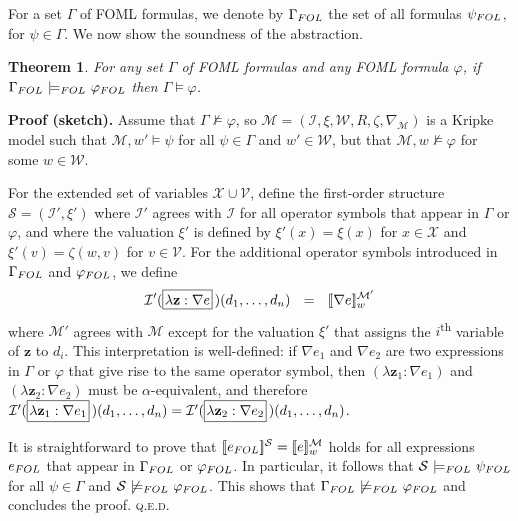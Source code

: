 \documentclass{easychair}
\renewcommand{\vec}[1]{\mathbf{#1}}
\renewcommand{\qed}{\hspace*{\fill}\textsc{q.e.d.}}
\renewcommand{\th}{\textsuperscript{th}\xspace}
\newcommand{\sem}[1]{\ensuremath{[\![ #1 ]\!]}}
\newcommand{\FOL}[1]{\ensuremath{#1_{\textit{\scriptsize FOL}}}}
\newcommand{\folmodels}{\mathop{\models_{\textit{\scriptsize FOL}}}}
\newcommand{\nfolmodels}{\mathop{\not\models_{\textit{\scriptsize FOL}}}}
\newcommand{\modal}{\nabla}
\newcommand{\II}{\mathcal{I}}
\newcommand{\MM}{\mathcal{M}}
\renewcommand{\SS}{\mathcal{S}}
\newcommand{\VV}{\mathcal{V}}
\newcommand{\WW}{\mathcal{W}}
\newcommand{\XX}{\mathcal{X}}
\newcommand{\B}[1]{\framebox{\rule{0pt}{.6em}\ensuremath{\!\tlachars #1\!}}\,}
\newcommand{\edmargin}[2]{\marginpar{\raggedright\footnotesize\color{red}#1: #2}}
\newcommand{\edmargin}[2]{}
\def\llmargin{\edmargin{LL}}
\newtheorem{theorem}{Theorem}
\newenvironment{proofsketch}{\par\noindent\textbf{Proof (sketch).}\quad}{\medskip\par\noindent}
\let\tlachars\relax
\let\notla\relax
\begin{document}
For a set $\Gamma$ of FOML formulas, we denote by $\FOL{\Gamma}$ the set of all
formulas $\FOL{\psi}$, for $\psi \in \Gamma$. We now show the soundness of the
abstraction.
%
\begin{theorem}\label{thm:coal-modal}
  For any set $\Gamma$ of FOML formulas and any FOML formula $\varphi$,
  if $\FOL{\Gamma} \,\folmodels \,\FOL{\varphi}$ then $\Gamma \models \varphi$.
\end{theorem}
\begin{proofsketch}
  Assume that $\Gamma \not\models \varphi$, so
  $\MM = (\II, \xi, \WW, R, \zeta, \modal_{\MM})$ is a Kripke model such that
  $\MM,w' \models \psi$ for all $\psi \in \Gamma$ and $w' \in \WW$, but that
  $\MM,w \not\models \varphi$ for some $w \in \WW$.

  For the extended set of variables $\XX \cup \VV$, define the first-order
  structure $\SS = (\II', \xi')$ where $\II'$ agrees with $\II$ for all operator
  symbols that appear in $\Gamma$ or $\varphi$, and where the valuation
  $\xi'$ is
  defined by $\xi'(x) = \xi(x)$ for $x \in \XX$
  and $\xi'(v) = \zeta(w,v)$ for $v
  \in \VV$. For the additional operator symbols introduced in $\FOL{\Gamma}$ and
  $\FOL{\varphi}$, we define
  \[
    \II'(\B{\lambda \vec{z}: \modal e})(d_1, \ldots, d_n)\ \ =\ \
    \sem{\modal e}^{\MM'}_w
  \]
  where $\MM'$ agrees with $\MM$ except for the valuation $\xi'$ that assigns
  the $i$\th variable of $\vec{z}$ to $d_i$. This interpretation is
  well-defined: if
  $\modal e_1$ and $\modal e_2$ are two expressions in $\Gamma$ or $\varphi$ that
  give rise to the same operator symbol, then $(\lambda \vec{z}_1 : \modal e_1)$
  and $(\lambda \vec{z}_2 : \modal e_2)$ must be $\alpha$-equivalent, and
  therefore $\II'(\B{\lambda \vec{z}_1: \modal e_1})(d_1, \ldots, d_n) =
  \II'(\B{\lambda \vec{z}_2: \modal e_2})(d_1, \ldots, d_n)$.

  It is straightforward to prove that $\notla\sem{\FOL{e}}^{\SS} = \sem{e}^{\MM}_w$
  holds for all expressions $\FOL{e}$ that appear in $\FOL{\Gamma}$ or
  $\FOL{\varphi}$. In particular, it follows that $\SS \,\folmodels \,\FOL{\psi}$
  for all $\psi \in \Gamma$ and $\SS \,\nfolmodels\, \FOL{\varphi}$. This shows that
  $\FOL{\Gamma} \,\nfolmodels\, \FOL{\varphi}$ and concludes the proof.
  \qed
\end{proofsketch}
\end{document}
